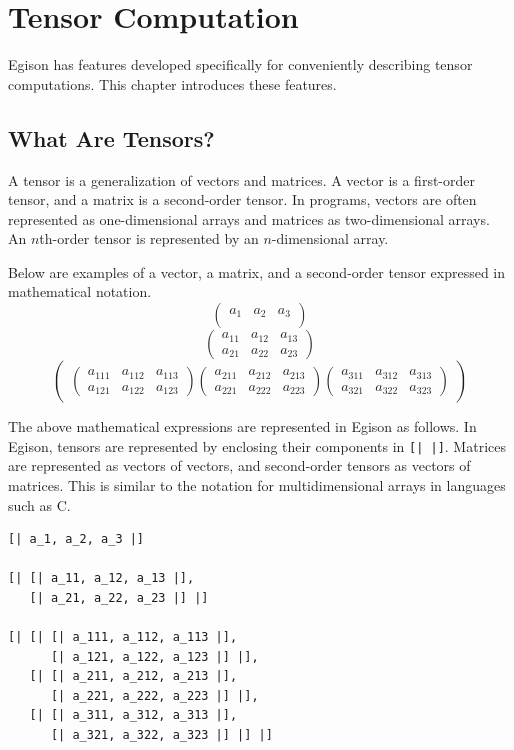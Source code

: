 \chapter{Tensor Computation}\label{tensor}

Egison has features developed specifically for conveniently describing tensor computations.
This chapter introduces these features.

\section{What Are Tensors?}

A tensor is a generalization of vectors and matrices.
A vector is a first-order tensor, and a matrix is a second-order tensor.
In programs, vectors are often represented as one-dimensional arrays and matrices as two-dimensional arrays.
An $n$th-order tensor is represented by an $n$-dimensional array.

Below are examples of a vector, a matrix, and a second-order tensor expressed in mathematical notation.
$$
\begin{pmatrix}
a_{1} & a_{2} & a_{3}\\
\end{pmatrix}
$$
$$
\begin{pmatrix}
a_{11} & a_{12} & a_{13} \\
a_{21} & a_{22} & a_{23}
\end{pmatrix}
$$
$$
\begin{pmatrix}

\begin{pmatrix}
a_{111} & a_{112} & a_{113} \\
a_{121} & a_{122} & a_{123} 
\end{pmatrix}

\begin{pmatrix}
a_{211} & a_{212} & a_{213} \\
a_{221} & a_{222} & a_{223} 
\end{pmatrix}

\begin{pmatrix}
a_{311} & a_{312} & a_{313} \\
a_{321} & a_{322} & a_{323} 
\end{pmatrix}

\end{pmatrix}
$$

The above mathematical expressions are represented in Egison as follows.
In Egison, tensors are represented by enclosing their components in \lstinline![| |]!.
Matrices are represented as vectors of vectors, and second-order tensors as vectors of matrices.
This is similar to the notation for multidimensional arrays in languages such as C.
\begin{lstlisting}[language=egison,numbers=none]
[| a_1, a_2, a_3 |]

[| [| a_11, a_12, a_13 |],
   [| a_21, a_22, a_23 |] |]

[| [| [| a_111, a_112, a_113 |],
      [| a_121, a_122, a_123 |] |],
   [| [| a_211, a_212, a_213 |],
      [| a_221, a_222, a_223 |] |],
   [| [| a_311, a_312, a_313 |],
      [| a_321, a_322, a_323 |] |] |]
\end{lstlisting}

